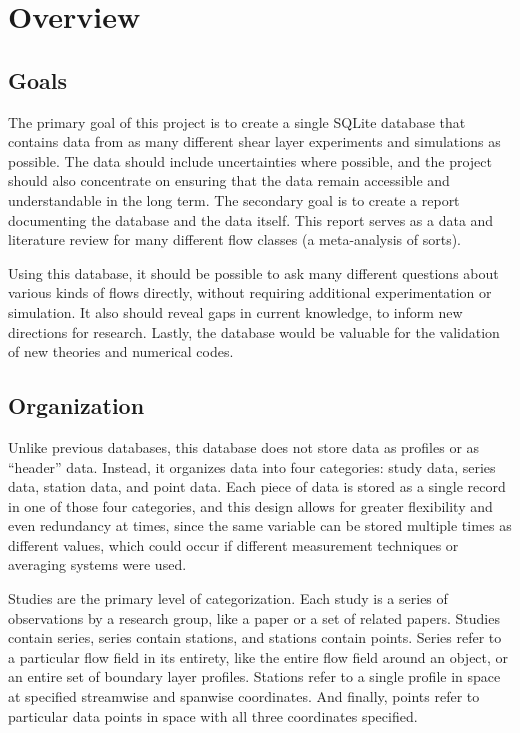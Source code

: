 %

\chapter{Overview}

\section{Goals}

The primary goal of this project is to create a single SQLite database that
contains data from as many different shear layer experiments and simulations as
possible.  The data should include uncertainties where possible, and the
project should also concentrate on ensuring that the data remain accessible and
understandable in the long term.  The secondary goal is to create a report
documenting the database and the data itself.  This report serves as a data and
literature review for many different flow classes (a meta-analysis of sorts).

Using this database, it should be possible to ask many different questions
about various kinds of flows directly, without requiring additional
experimentation or simulation.  It also should reveal gaps in current
knowledge, to inform new directions for research.  Lastly, the database would
be valuable for the validation of new theories and numerical codes.


\section{Organization}

Unlike previous databases, this database does not store data as profiles or as
``header'' data.  Instead, it organizes data into four categories: study data,
series data, station data, and point data.  Each piece of data is stored as a
single record in one of those four categories, and this design allows for
greater flexibility and even redundancy at times, since the same variable can
be stored multiple times as different values, which could occur if different
measurement techniques or averaging systems were used.

Studies are the primary level of categorization.  Each study is a series of
observations by a research group, like a paper or a set of related papers.
Studies contain series, series contain stations, and stations contain points.
Series refer to a particular flow field in its entirety, like the entire flow
field around an object, or an entire set of boundary layer profiles.  Stations
refer to a single profile in space at specified streamwise and spanwise
coordinates.  And finally, points refer to particular data points in space with
all three coordinates specified.

